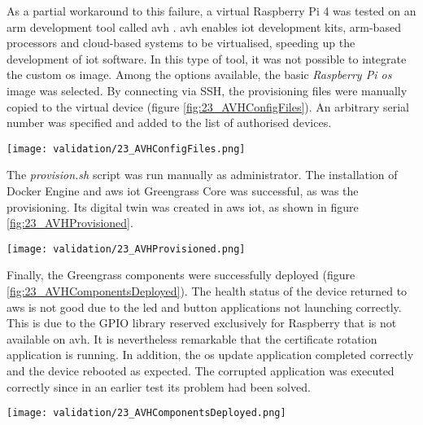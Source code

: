 As a partial workaround to this failure, a virtual Raspberry Pi 4 was tested on an \gls{arm} development tool called \acrfull{avh} \cite{arm_avh}. \acrshort{avh} enables \acrshort{iot} development kits, \gls{arm}-based processors and cloud-based systems to be virtualised, speeding up the development of \acrshort{iot} software. In this type of tool, it was not possible to integrate the custom \acrshort{os} image. Among the options available, the basic \textit{Raspberry Pi \acrshort{os}} image was selected. By connecting via SSH, the provisioning files were manually copied to the virtual device (figure \ref{fig:23_AVHConfigFiles}). An arbitrary serial number was specified and added to the list of authorised devices.
\begin{center}
    \begingroup
    \texttt{[image: validation/23\_AVHConfigFiles.png]}
    \label{fig:23_AVHConfigFiles}
    \endgroup
\end{center}
The \textit{provision.sh} script was run manually as administrator. The installation of Docker Engine and \gls{aws} \acrshort{iot} Greengrass Core was successful, as was the provisioning. Its digital twin was created in \gls{aws} \acrshort{iot}, as shown in figure \ref{fig:23_AVHProvisioned}.
\begin{center}
    \begingroup
    \texttt{[image: validation/23\_AVHProvisioned.png]}
    \label{fig:23_AVHProvisioned}
    \endgroup
\end{center}
Finally, the Greengrass components were successfully deployed (figure \ref{fig:23_AVHComponentsDeployed}). The health status of the device returned to \gls{aws} is not good due to the led and button applications not launching correctly. This is due to the GPIO library reserved exclusively for Raspberry that is not available on \acrshort{avh}. It is nevertheless remarkable that the certificate rotation application is running. In addition, the \acrshort{os} update application completed correctly and the device rebooted as expected. The corrupted application was executed correctly since in an earlier test its problem had been solved.
\begin{center}
    \begingroup
    \texttt{[image: validation/23\_AVHComponentsDeployed.png]}
    \label{fig:23_AVHComponentsDeployed}
    \endgroup
\end{center}

